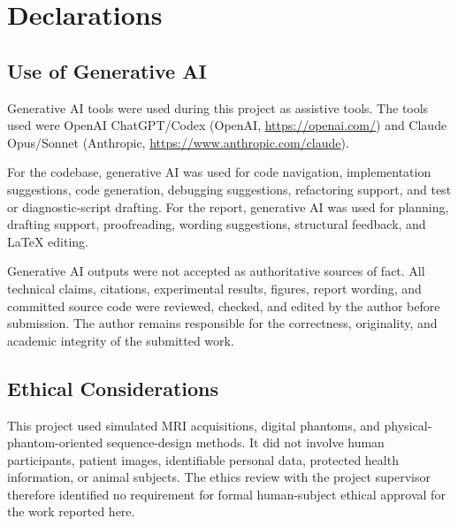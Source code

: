 \cleardoublepage{}
{}\mtcaddchapter
\chapter*{Declarations}
\addtocounter{counter}{-1}

\section*{Use of Generative AI}

Generative AI tools were used during this project as assistive tools. The tools used were OpenAI ChatGPT/Codex (OpenAI, \url{https://openai.com/}) and Claude Opus/Sonnet (Anthropic, \url{https://www.anthropic.com/claude}).

For the codebase, generative AI was used for code navigation, implementation suggestions, code generation, debugging suggestions, refactoring support, and test or diagnostic-script drafting. For the report, generative AI was used for planning, drafting support, proofreading, wording suggestions, structural feedback, and LaTeX editing.

Generative AI outputs were not accepted as authoritative sources of fact. All technical claims, citations, experimental results, figures, report wording, and committed source code were reviewed, checked, and edited by the author before submission. The author remains responsible for the correctness, originality, and academic integrity of the submitted work.


\section*{Ethical Considerations}

This project used simulated MRI acquisitions, digital phantoms, and physical-phantom-oriented sequence-design methods. It did not involve human participants, patient images, identifiable personal data, protected health information, or animal subjects. The ethics review with the project supervisor therefore identified no requirement for formal human-subject ethical approval for the work reported here.

